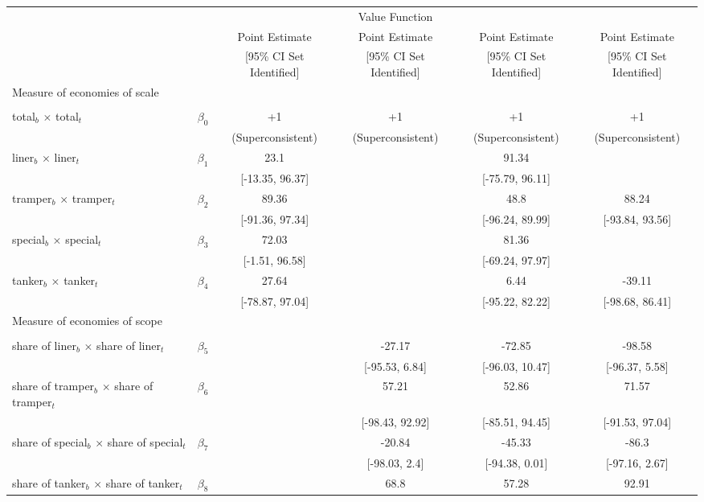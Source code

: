 \begin{tabular}{@{\extracolsep{5pt}}lccccc}
\toprule 
 &  &  & Value Function &  &  \\
 &  & Point Estimate & Point Estimate & Point Estimate & Point Estimate \\
 &  & [95\% CI Set Identified] & [95\% CI Set Identified] & [95\% CI Set Identified] & [95\% CI Set Identified] \\
\midrule 
Measure of economies of scale &  &  &  &  &  \\
 &  &  &  &  \\
total$_{b}$ $\times$ total$_{t}$ & $\beta_0$ & +1 & +1 & +1 & +1 \\
 &  & (Superconsistent) & (Superconsistent) & (Superconsistent) & (Superconsistent) \\
liner$_{b}$ $\times$ liner$_{t}$ & $\beta_1$ & 23.1 &  & 91.34 &  \\
 &  & [-13.35, 96.37] &  & [-75.79, 96.11] &  \\
tramper$_{b}$ $\times$ tramper$_{t}$ & $\beta_2$ & 89.36 &  & 48.8 & 88.24 \\
 &  & [-91.36, 97.34] &  & [-96.24, 89.99] & [-93.84, 93.56] \\
special$_{b}$ $\times$ special$_{t}$ & $\beta_3$ & 72.03 &  & 81.36 &  \\
 &  & [-1.51, 96.58] &  & [-69.24, 97.97] &  \\
tanker$_{b}$ $\times$ tanker$_{t}$ & $\beta_4$ & 27.64 &  & 6.44 & -39.11 \\
 &  & [-78.87, 97.04] &  & [-95.22, 82.22] & [-98.68, 86.41] \\
Measure of economies of scope &  &  &  &  &  \\
 &  &  &  &  &  \\
share of liner$_{b}$ $\times$ share of liner$_{t}$ & $\beta_5$ &  & -27.17 & -72.85 & -98.58 \\
 &  &  & [-95.53, 6.84] & [-96.03, 10.47] & [-96.37, 5.58] \\
share of tramper$_{b}$ $\times$ share of tramper$_{t}$ & $\beta_6$ &  & 57.21 & 52.86 & 71.57 \\
 &  &  & [-98.43, 92.92] & [-85.51, 94.45] & [-91.53, 97.04] \\
share of special$_{b}$ $\times$ share of special$_{t}$ & $\beta_7$ &  & -20.84 & -45.33 & -86.3 \\
 &  &  & [-98.03, 2.4] & [-94.38, 0.01] & [-97.16, 2.67] \\
share of tanker$_{b}$ $\times$ share of tanker$_{t}$ & $\beta_8$ &  & 68.8 & 57.28 & 92.91 \\

\end{tabular}
